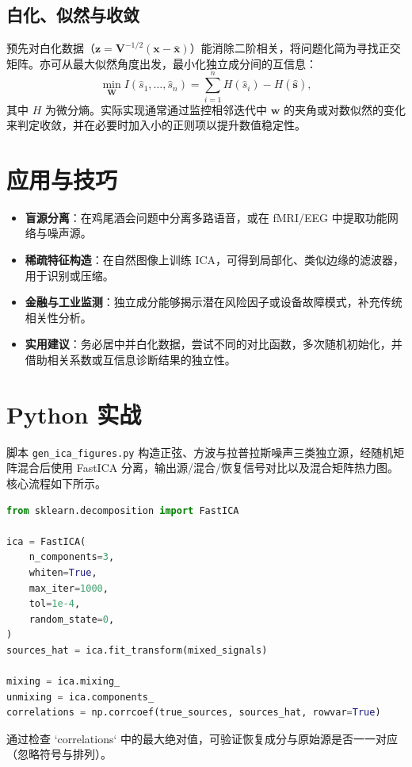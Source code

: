 \documentclass[UTF8,zihao=-4]{ctexart}
\begin{document}
\subsection{白化、似然与收敛}
预先对白化数据（\(\mathbf{z}=\mathbf{V}^{-1/2}(\mathbf{x}-\bar{\mathbf{x}})\)）能消除二阶相关，将问题化简为寻找正交矩阵。亦可从最大似然角度出发，最小化独立成分间的互信息：
\begin{equation}
\min_{\mathbf{W}} I(\hat{s}_1, \dots, \hat{s}_n) = \sum_{i=1}^n H(\hat{s}_i) - H(\hat{\mathbf{s}}),
\end{equation}
其中 \(H\) 为微分熵。实际实现通常通过监控相邻迭代中 \(\mathbf{w}\) 的夹角或对数似然的变化来判定收敛，并在必要时加入小的正则项以提升数值稳定性。

\section{应用与技巧}
\begin{itemize}
  \item \textbf{盲源分离}：在鸡尾酒会问题中分离多路语音，或在 fMRI/EEG 中提取功能网络与噪声源。
  \item \textbf{稀疏特征构造}：在自然图像上训练 ICA，可得到局部化、类似边缘的滤波器，用于识别或压缩。
  \item \textbf{金融与工业监测}：独立成分能够揭示潜在风险因子或设备故障模式，补充传统相关性分析。
  \item \textbf{实用建议}：务必居中并白化数据，尝试不同的对比函数，多次随机初始化，并借助相关系数或互信息诊断结果的独立性。
\end{itemize}

\section{Python 实战}
脚本 \texttt{gen\_ica\_figures.py} 构造正弦、方波与拉普拉斯噪声三类独立源，经随机矩阵混合后使用 FastICA 分离，输出源/混合/恢复信号对比以及混合矩阵热力图。核心流程如下所示。
\begin{lstlisting}[language=Python,caption={脚本 gen_ica_figures.py 片段}]
from sklearn.decomposition import FastICA

ica = FastICA(
    n_components=3,
    whiten=True,
    max_iter=1000,
    tol=1e-4,
    random_state=0,
)
sources_hat = ica.fit_transform(mixed_signals)

mixing = ica.mixing_
unmixing = ica.components_
correlations = np.corrcoef(true_sources, sources_hat, rowvar=True)
\end{lstlisting}
通过检查 `correlations` 中的最大绝对值，可验证恢复成分与原始源是否一一对应（忽略符号与排列）。
\end{document}
